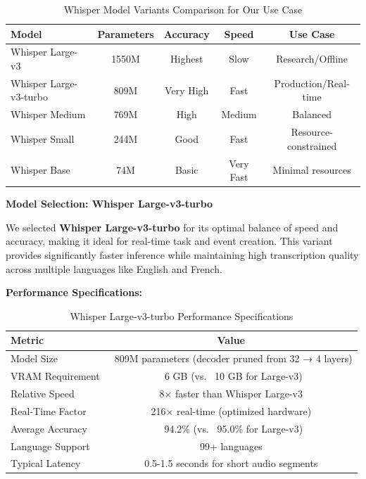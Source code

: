 \documentclass[12pt,a4paper]{article}
\begin{document}
\begin{table}[H]
\centering
\begin{tabular}{|l|c|c|c|c|}
\hline
\textbf{Model} & \textbf{Parameters} & \textbf{Accuracy} & \textbf{Speed} & \textbf{Use Case} \\
\hline
Whisper Large-v3 & 1550M & Highest & Slow & Research/Offline \\
\hline
Whisper Large-v3-turbo & 809M & Very High & Fast & Production/Real-time \\
\hline
Whisper Medium & 769M & High & Medium & Balanced \\
\hline
Whisper Small & 244M & Good & Fast & Resource-constrained \\
\hline
Whisper Base & 74M & Basic & Very Fast & Minimal resources \\
\hline
\end{tabular}
\caption{Whisper Model Variants Comparison for Our Use Case}
\end{table}

\textbf{Model Selection: Whisper Large-v3-turbo}

We selected \textbf{Whisper Large-v3-turbo} for its optimal balance of speed and accuracy, making it ideal for real-time task and event creation. This variant provides significantly faster inference while maintaining high transcription quality across multiple languages like English and French.


\textbf{Performance Specifications:}
\begin{table}[H]
\centering
\begin{tabular}{|l|c|}
\hline
\textbf{Metric} & \textbf{Value} \\
\hline
Model Size & ~809M parameters (decoder pruned from 32 → 4 layers) \\
\hline
VRAM Requirement & ~6 GB (vs. ~10 GB for Large-v3) \\
\hline
Relative Speed & 8× faster than Whisper Large-v3 \\
\hline
Real-Time Factor & 216× real-time (optimized hardware) \\
\hline
Average Accuracy & ~94.2\% (vs. ~95.0\% for Large-v3) \\
\hline
Language Support & 99+ languages \\
\hline
Typical Latency & 0.5-1.5 seconds for short audio segments \\
\hline
\end{tabular}
\caption{Whisper Large-v3-turbo Performance Specifications}
\end{table}
\end{document}
